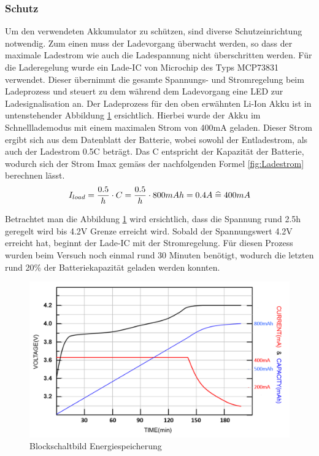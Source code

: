 \subsubsection{Schutz}
Um den verwendeten Akkumulator zu schützen, sind diverse Schutzeinrichtung notwendig. Zum einen muss der Ladevorgang überwacht werden, so dass der maximale Ladestrom wie auch die Ladespannung nicht überschritten werden. Für die Laderegelung wurde ein Lade-IC von Microchip des Typs MCP73831 verwendet. Dieser übernimmt die gesamte Spannungs- und Stromregelung beim Ladeprozess und steuert zu dem während dem Ladevorgang eine LED zur Ladesignalisation an. Der Ladeprozess für den oben erwähnten Li-Ion Akku ist in untenstehender Abbildung  \ref{fig:Ladekurve Li-Ion Akku} ersichtlich. Hierbei wurde der Akku im Schnelllademodus mit einem maximalen Strom von 400mA geladen. Dieser Strom ergibt sich aus dem Datenblatt der Batterie, wobei sowohl der Entladestrom, als auch der Ladestrom 0.5C beträgt. Das C entspricht der Kapazität der Batterie, wodurch sich der Strom Imax gemäss der nachfolgenden Formel \ref{fig:Ladestrom} berechnen lässt.
\begin{equation}
I_{load}={\frac{0.5}{h} \cdot C}={\frac{0.5}{h} \cdot 800mAh}=0.4A\thickspace \widehat {=} \thickspace 400mA
\label{fig:Ladestrom}
\end{equation}

Betrachtet man die Abbildung \ref{fig:Ladekurve Li-Ion Akku} wird ersichtlich, dass die Spannung rund 2.5h geregelt wird bis 4.2V Grenze erreicht wird. Sobald der Spannungswert 4.2V erreicht hat, beginnt der Lade-IC mit der Stromregelung. Für diesen Prozess wurden beim Versuch noch einmal rund 30 Minuten benötigt, wodurch die letzten rund 20$\%$ der Batteriekapazität geladen werden konnten.

\begin{figure}[H]
	\begin{center}
		\includegraphics[width=120mm]{data/LadekurveLiIon.png}
		\caption{Blockschaltbild Energiespeicherung} %
		\label{fig:Ladekurve Li-Ion Akku}
	\end{center}
\end{figure}


